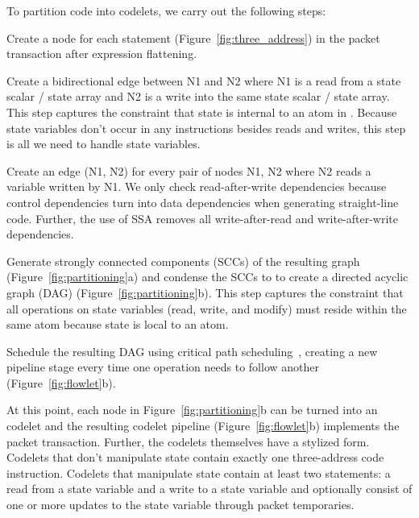 To partition code into codelets, we carry out the following steps:
\begin{CompactEnumerate}
  \item Create a node for each statement (Figure~\ref{fig:three_address}) in
    the packet transaction after expression flattening.
  \item Create a bidirectional edge between N1 and N2 where N1 is a read from a
    state scalar / state array and N2 is a write into the same state scalar /
    state array. This step captures the constraint that state is internal to an
    atom in \absmachine. Because state variables don't occur in any
    instructions besides reads and writes, this step is all we need to handle
    state variables.
  \item Create an edge (N1, N2) for every pair of nodes N1, N2 where N2 reads
    a variable written by N1. We only check read-after-write dependencies because
    control dependencies turn into data dependencies when generating straight-line
    code. Further, the use of SSA removes all write-after-read and write-after-write
    dependencies.
  \item Generate strongly connected components (SCCs) of the resulting graph
    (Figure~\ref{fig:partitioning}a) and condense the SCCs to to create a directed
    acyclic graph (DAG) (Figure~\ref{fig:partitioning}b). This step captures the
    constraint that all operations on state variables (read, write, and modify)
    must reside within the same atom because state is local to an atom.
  \item Schedule the resulting DAG using critical path
    scheduling~\cite{crit_path_sched}, creating a new pipeline stage every time
    one operation needs to follow another (Figure~\ref{fig:flowlet}b).
\end{CompactEnumerate}

At this point, each node in Figure~\ref{fig:partitioning}b can be turned into an codelet
and the resulting codelet pipeline (Figure~\ref{fig:flowlet}b) implements the
packet transaction.  Further, the codelets themselves have a stylized form.
Codelets that don't manipulate state contain exactly one three-address code
instruction. Codelets that manipulate state contain at least two statements: a
read from a state variable and a write to a state variable and optionally
consist of one or more updates to the state variable through packet
temporaries.

